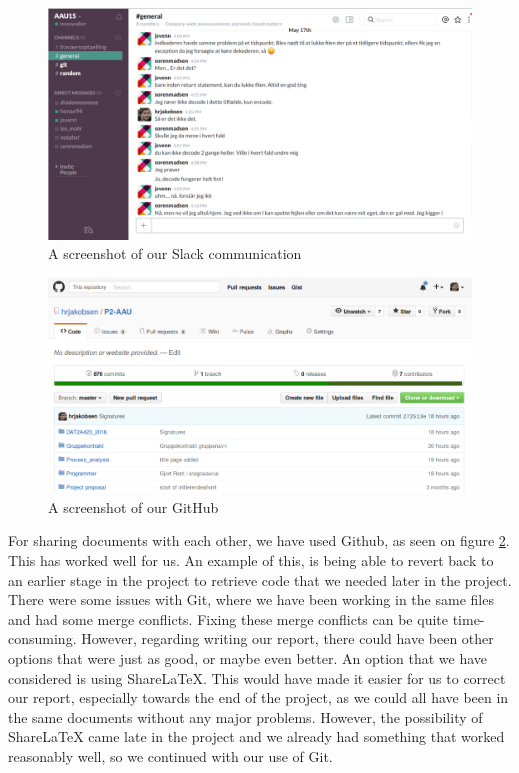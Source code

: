 \begin{figure}
	\centering
	\includegraphics[width=1 \textwidth]{figures/slack.png}
	\caption{A screenshot of our Slack communication}
	\label{fig:slack}
\end{figure}

\begin{figure}
	\centering
	\includegraphics[width=1 \textwidth]{figures/git.png}
	\caption{A screenshot of our GitHub}
	\label{fig:git}
\end{figure}

For sharing documents with each other, we have used Github, as seen on figure \ref{fig:git}.
This has worked well for us. 
An example of this, is being able to revert back to an earlier stage in the project to retrieve code that we needed later in the project.
There were some issues with Git, where we have been working in the same files and had some merge conflicts.
Fixing these merge conflicts can be quite time-consuming.
However, regarding writing our report, there could have been other options that were just as good, or maybe even better.
An option that we have considered is using ShareLaTeX.
This would have made it easier for us to correct our report, especially towards the end of the project, as we could all have been in the same documents without any major problems.
However, the possibility of ShareLaTeX came late in the project and we already had something that worked reasonably well, so we continued with our use of Git.


